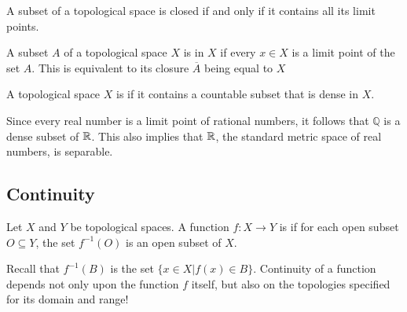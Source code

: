 \begin{theorem}
A subset of a topological space is closed if and only if it contains all its limit points.
\end{theorem}

\begin{definition}
A subset $A$ of a topological space $X$ is  in $X$ if every $x\in X$ is a limit point of the set $A$.
This is equivalent to its closure $\overline{A}$ being equal to $X$
\end{definition}

\begin{definition}
A topological space $X$ is  if it contains a countable subset that is dense in $X$.
\end{definition}

\begin{example}
Since every real number is a limit point of rational numbers, it follows that $\mathbb{Q}$ is a dense subset of $\mathbb{R}$.
This also implies that $\mathbb{R}$, the standard metric space of real numbers, is separable.
\end{example}


\subsection{Continuity}

\begin{definition}
Let $X$ and $Y$ be topological spaces.
A function $f: X \rightarrow Y$ is  if for each open subset $O \subseteq Y$, the set $f^{-1} (O)$ is an open subset of $X$.
\end{definition}

Recall that $f^{-1}(B)$ is the set $\{ x \in X | f(x) \in B \}$.
Continuity of a function depends not only upon the function $f$ itself, but also on the topologies specified for its domain and range!

